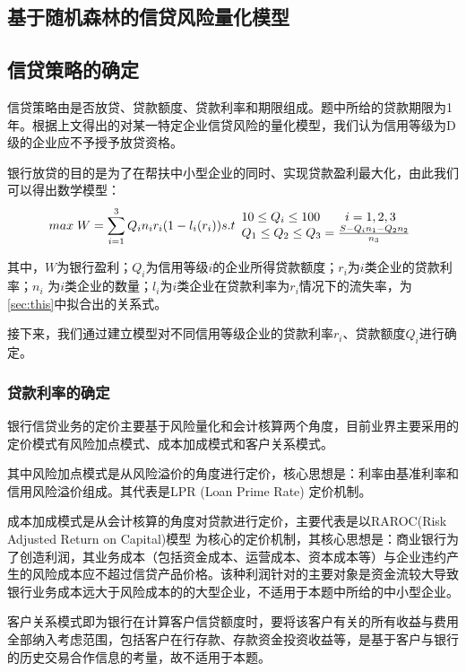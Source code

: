\documentclass[withoutpreface,bwprint]{cumcmthesis} %
\begin{document}
\subsection{基于随机森林的信贷风险量化模型}

\subsection{信贷策略的确定}
信贷策略由是否放贷、贷款额度、贷款利率和期限组成。题中所给的贷款期限为1年。根据上文得出的对某一特定企业信贷风险的量化模型，我们认为信用等级为D级的企业应不予授予放贷资格。

银行放贷的目的是为了在帮扶中小型企业的同时、实现贷款盈利最大化，由此我们可以得出数学模型：
\begin{equation}
max\;W=\sum_{i=1}^3 Q_in_ir_i(1-l_i(r_i))
$$
$$
s.t
\begin{array}{l}
10\leq Q_i\leq100\qquad i=1,2,3\\
Q_1\leq Q_2\leq Q_3= \frac{S-Q_in_1-Q_2n_2}{n_3}
\end{array}
\end{equation}

其中，$W$为银行盈利；$Q_i$为信用等级$i$的企业所得贷款额度；$r_i$为$i$类企业的贷款利率；$n_i$
为$i$类企业的数量；$l_i$为$i$类企业在贷款利率为$r_i$情况下的流失率，为\ref{sec:this}中拟合出的关系式。

接下来，我们通过建立模型对不同信用等级企业的贷款利率$r_i$、贷款额度$Q_i$进行确定。
\subsubsection{贷款利率的确定}

银行信贷业务的定价主要基于风险量化和会计核算两个角度，目前业界主要采用的定价模式有风险加点模式、成本加成模式和客户关系模式。\cite{马春明2014基于财务报表视角的邮政储蓄银行哈尔滨分行信贷风险管理研究}

其中风险加点模式是从风险溢价的角度进行定价，核心思想是：利率由基准利率和信用风险溢价组成。其代表是LPR (Loan Prime Rate) \cite{鲍毅莺2020贷款基础利率} 定价机制。

成本加成模式是从会计核算的角度对贷款进行定价，主要代表是以RAROC(Risk Adjusted Return on Capital)模型 \cite{李海涛2004RAROC} 为核心的定价机制，其核心思想是：商业银行为了创造利润，其业务成本（包括资金成本、运营成本、资本成本等）与企业违约产生的风险成本应不超过信贷产品价格。该种利润针对的主要对象是资金流较大导致银行业务成本远大于风险成本的的大型企业，不适用于本题中所给的中小型企业。

客户关系模式即为银行在计算客户信贷额度时，要将该客户有关的所有收益与费用全部纳入考虑范围，包括客户在行存款、存款资金投资收益等，是基于客户与银行的历史交易合作信息的考量，故不适用于本题。
\end{document}
